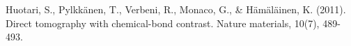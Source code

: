 \documentclass[aps,prl,groupedaddress]{revtex4}
\begin{document}
\begin{thebibliography}{}
 Huotari, S., Pylkk\"anen, T., Verbeni, R., Monaco, G., \& H\"am\"al\"ainen, K. (2011). Direct tomography with chemical-bond contrast. Nature materials, 10(7), 489-493.



\end{thebibliography}
\end{document}
